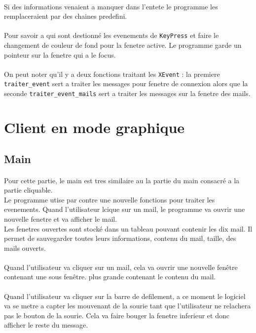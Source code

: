 \documentclass[a4paper, titlepage, oneside, 12pt]{article}%
\begin{document}
\paragraph{}
Si des informations venaient a manquer dans l'entete le programme les remplaceraient par des chaines predefini. 

\paragraph{}
Pour savoir a qui sont destionné les evenements de \texttt{KeyPress} et faire le changement de couleur de fond pour la fenetre active. Le programme garde un pointeur sur la fenetre qui a le focus.

\paragraph{}
On peut noter qu'il y a deux fonctions traitant les \texttt{XEvent} : la premiere \texttt{traiter\_event} sert a traiter les messages pour fenetre de connexion alors que la seconde \texttt{traiter\_event\_mails} sert a traiter les messages sur la fenetre des mails.

\section{Client en mode graphique}
\subsection{Main}
\paragraph{}
Pour cette partie, le main est tres similaire au la partie du main consacré a la partie cliquable.\\
Le programme utise par contre une nouvelle fonctions pour traiter les evenements. Quand l'utilisateur lcique sur un mail, le programme va ouvrir une nouvelle fenetre et va afficher le mail.\\
Les fenetres ouvertes sont stocké dans un tableau pouvant contenir les dix mail. Il permet de  sauvegarder toutes leurs informations, contenu du mail, taille, des mails ouverts.

\paragraph{}
Quand l'utilisateur va cliquer sur un mail, cela va ouvrir une nouvelle fenêtre contenant une sous fenêtre. plus grande contenant le contenu du mail.

\paragraph{}
Quand l'utilisateur va cliquer sur la barre de defilement, a ce moment le logiciel va se metre a capter les mouvenant de la sourie tant que l'utilisateur ne relachera pas le bouton de la sourie. Cela va faire bouger la fenetre inferieur et donc afficher le reste du message. \\
\end{document}
